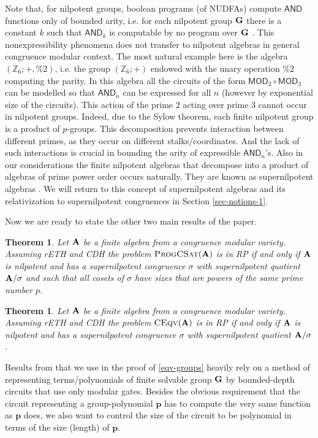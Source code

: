 \documentclass[11pt,a4paper]{amsart}
\newtheorem{thm}[lm]{Theorem}
\newcommand{\rptime}{\textsf{RP}\xspace}
\newcommand{\m}[1]{{\uppercase {\bf{#1}}}}
\newcommand{\po}[1]{{\mathbf {#1}}}
\newcommand{\gProblem}[2]{\ensuremath{\operatorname{\textup{\textsc{{#2}}}}
		\ifthenelse{\equal{#1}{}}{}{\!\left( {#1} \right)}}}
\newcommand{\ceqv}[1]{\gProblem{#1}{CEqv}}
\newcommand{\progcsat}[1]{\gProblem{#1}{ProgCSat}}
\newcommand{\z}{\mathbb{Z}}
\newcommand{\ccand}{\mathsf{AND}}
\newcommand{\ccmod}{\mathsf{MOD}}
\newcommand{\cdhh}{CDH\xspace}
\newcommand{\rethh}{rETH\xspace}
\begin{document}
Note that, for nilpotent groups, boolean programs (of NUDFAs) compute $\ccand$ functions only of bounded arity, 
i.e. for each nilpotent group $\m G$ there is a constant $k$ such that $\ccand_k$ is computable by no program over $\m G$ \cite{BarringtonST90}. 
This nonexpressibility phenomena does not transfer to nilpotent algebras in general congruence modular context. The most natural example here is the algebra
$(\z_6; +,\%2)$, i.e. the group $(\z_6; +)$ endowed with the unary operation $\%2$ computing the parity.
In this algebra all the circuits of the form $\ccmod_2\circ\ccmod_3$ can be modelled so that $\ccand_n$ can be expressed for all $n$ (however by exponential size of the circuits).
This action of the prime $2$ acting over prime $3$ cannot occur in nilpotent groups.
Indeed, due to the Sylow theorem, each finite nilpotent group is a product of $p$-groups.
This decomposition prevents interaction between different primes, as they occur on different stalks/coordinates. And the lack of such interactions is crucial in bounding the arity of expressible $\ccand_n$'s. 
Also in our considerations the finite nilpotent algebras that decompose into a product of algebras of prime power order occurs naturally. 
They are known as supernilpotent  algebras  \cite{bulatov-kom, aichmud-2010}.
We will return to this concept of supernilpotent algebras and its relativization to supernilpotent congruences in Section \ref{sec-notions-1}. 

Now we are ready to state the other two main results of the paper.

\begin{thm}
\label{thm:cm-progcsat}
Let $\m A$ be a finite algebra from a congruence modular variety. 
Assuming \rethh and \cdhh
the problem $\progcsat{\m A}$ is in \rptime if and only if $\m A$ is nilpotent 
and has a supernilpotent congruence $\sigma$ with supernilpotent quotient $\m A/\sigma$ 
and such that all cosets of $\sigma$ have sizes that are powers of the same prime number $p$.
\end{thm}


\begin{thm}
\label{thm:cm-ceqv}
Let $\m A$ be a finite algebra from a congruence modular variety. 
Assuming \rethh and \cdhh
the problem $\ceqv{\m A}$ is in \rptime if and only if $\m A$ is nilpotent 
and has a supernilpotent congruence $\sigma$ with supernilpotent quotient $\m A/\sigma$. 
\end{thm}

Results from \cite{IdziakKKW22-icalp} that we use in the proof of \cref{eqv-groups}
heavily rely on a method of representing terms/polynomials of finite solvable group $\m G$
by bounded-depth circuits that use only modular gates.
Besides the obvious requirement that the circuit representing a group-polynomial $\po p$ has to compute the very same function as $\po p$ does, we also want to control the size of the circuit to be polynomial in terms of the size (length) of $\po p$.
\end{document}
